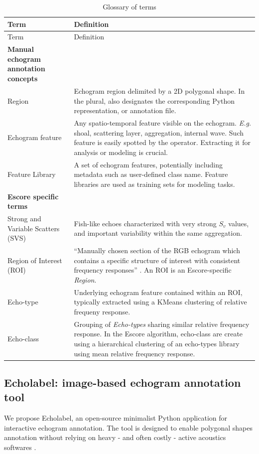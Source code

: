 \documentclass[
  10pt,
  letterpaper,
]{article}
\begin{document}
\begin{longtable}[]{@{}ll@{}}
\caption[]{Glossary of terms}\label{tbl-glossary}\tabularnewline
\toprule\noalign{}
Term & Definition \\
\midrule\noalign{}
\endfirsthead
\toprule\noalign{}
Term & Definition \\
\midrule\noalign{}
\endhead
\bottomrule\noalign{}
\endlastfoot
\textbf{Manual echogram annotation concepts} & \\
Region & Echogram region delimited by a 2D polygonal shape. In the
plural, also designates the corresponding Python representation, or
annotation file. \\
Echogram feature & Any spatio-temporal feature visible on the echogram.
\emph{E.g.} shoal, scattering layer, aggregation, internal wave. Such
feature is easily spotted by the operator. Extracting it for analysis or
modeling is crucial. \\
Feature Library & A set of echogram features, potentially including
metadata such as user-defined class name. Feature libraries are used as
training sets for modeling tasks. \\
\textbf{Escore specific terms} & \\
Strong and Variable Scatters (SVS) & Fish-like echoes characterized with
very strong \(S_v\) values, and important variability within the same
aggregation. \\
Region of Interest (ROI) & ``Manually chosen section of the RGB echogram
which contains a specific structure of interest with consistent
frequency responses'' \citep{annasawmy2024}. An ROI is an
Escore-specific \emph{Region}. \\
Echo-type & Underlying echogram feature contained within an ROI,
typically extracted using a KMeans clustering of relative frequeny
response. \\
Echo-class & Grouping of \emph{Echo-types} sharing similar relative
frequency response. In the Escore algorithm, echo-class are create using
a hierarchical clustering of an echo-types library using mean relative
frequency response. \\
\end{longtable}

\subsection{Echolabel: image-based echogram annotation
tool}\label{echolabel-image-based-echogram-annotation-tool}

We propose Echolabel, an open-source minimalist Python application for
interactive echogram annotation. The tool is designed to enable
polygonal shapes annotation without relying on heavy - and often costly
- active acoustics softwares \citep[see][ for existing
softwares]{lee2024a}.
\end{document}
